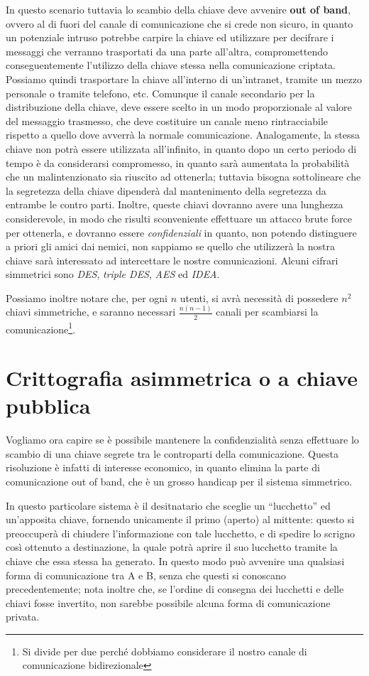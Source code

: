 In questo scenario tuttavia lo scambio della chiave deve avvenire \textbf{out of
band}, ovvero al di fuori del canale di comunicazione che si crede non sicuro,
in quanto un potenziale intruso potrebbe carpire la chiave ed utilizzare per
decifrare i messaggi che verranno trasportati da una parte all'altra,
compromettendo conseguentemente l'utilizzo della chiave stessa nella comunicazione
criptata. Possiamo quindi trasportare la chiave all'interno di un'intranet,
tramite un mezzo personale o tramite telefono, etc. Comunque il canale secondario per la distribuzione della chiave, deve
essere scelto in un modo proporzionale al valore del messaggio trasmesso, che
deve costituire un canale meno rintracciabile rispetto a quello dove avverrà 
la normale comunicazione. Analogamente, la stessa chiave non potrà essere
utilizzata all'infinito, in quanto dopo un certo periodo di tempo è da considerarsi
compromesso, in quanto sarà aumentata la probabilità che un malintenzionato
sia riuscito ad ottenerla; tuttavia bisogna sottolineare che la segretezza della
chiave dipenderà dal mantenimento della segretezza da entrambe le contro parti.
 Inoltre, queste chiavi dovranno avere una lunghezza
considerevole, in modo che risulti sconveniente effettuare un attacco brute force
per ottenerla, e dovranno essere \textit{confidenziali} in quanto, non potendo
distinguere a priori gli amici dai nemici, non sappiamo se quello che utilizzerà
la nostra chiave sarà interessato ad intercettare le nostre comunicazioni. Alcuni 
cifrari simmetrici sono \textit{DES}, \textit{triple DES}, \textit{AES}
ed \textit{IDEA}.

Possiamo inoltre notare che, per ogni $n$ utenti, si avrà necessità di possedere
$n^2$ chiavi simmetriche, e saranno necessari 
$\frac{n(n-1)}{2}$ canali per scambiarsi la comunicazione\footnote{Si divide per
due perché dobbiamo considerare il nostro canale di comunicazione bidirezionale}.


\section{Crittografia asimmetrica o a chiave pubblica}
Vogliamo ora capire se è possibile mantenere la confidenzialità senza effettuare 
lo scambio di una chiave segrete tra le controparti della comunicazione. Questa
risoluzione è infatti di interesse economico, in quanto elimina la parte di 
comunicazione out of band, che è un grosso handicap per il sistema simmetrico.


In questo particolare sistema è il desitnatario che sceglie un ``lucchetto'' ed
un'apposita chiave, fornendo unicamente il primo (aperto) al mittente: questo
si preoccuperà di chiudere l'informazione con tale lucchetto, e di spedire
lo scrigno così ottenuto a destinazione, la quale potrà aprire il suo lucchetto
tramite la chiave che essa stessa ha generato. In questo modo può avvenire una
qualsiasi forma di comunicazione tra A e B, senza che questi si conoscano
precedentemente; nota inoltre che, se l'ordine di consegna dei lucchetti e delle
chiavi fosse invertito, non sarebbe possibile alcuna forma di comunicazione
privata.


